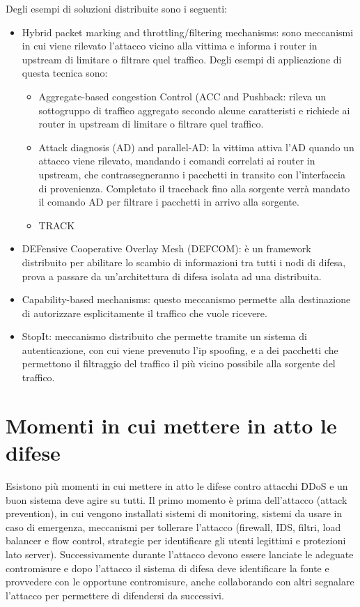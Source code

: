 Degli esempi di soluzioni distribuite sono i seguenti:
\begin{itemize}
    \item Hybrid packet marking and throttling/filtering mechanisms: sono meccanismi in cui viene rilevato l'attacco vicino alla vittima e informa i router in upstream di limitare o filtrare quel traffico. Degli esempi di applicazione di questa tecnica sono:
    \begin{itemize}
        \item Aggregate-based  congestion Control (ACC and Pushback: rileva un sottogruppo di traffico aggregato secondo alcune caratteristi e richiede ai router in upstream di limitare o filtrare quel traffico.
        \item Attack diagnosis (AD) and parallel-AD: la vittima attiva l'AD quando un attacco viene rilevato, mandando i comandi correlati ai router in upstream, che contrassegneranno i pacchetti in transito con l'interfaccia di provenienza. Completato il traceback fino alla sorgente verrà mandato il comando AD per filtrare i pacchetti in arrivo alla sorgente.
        \item TRACK
    \end{itemize}
    \item DEFensive Cooperative Overlay Mesh (DEFCOM): è un framework distribuito per abilitare lo scambio di informazioni tra tutti i nodi di difesa, prova a passare da un'architettura di difesa isolata ad una distribuita.
    \item Capability-based mechanisms: questo meccanismo permette alla destinazione di autorizzare esplicitamente il traffico che vuole ricevere.
    \item StopIt: meccanismo distribuito che permette tramite un sistema di autenticazione, con cui viene prevenuto l'ip spoofing, e a dei pacchetti che permettono il filtraggio del traffico il più vicino possibile alla sorgente del traffico.

\end{itemize}

\section{Momenti in cui mettere in atto le difese}

Esistono più momenti in cui mettere in atto le difese contro attacchi DDoS e un buon sistema deve agire su tutti.
Il primo momento è prima dell'attacco (attack prevention), in cui vengono installati sistemi di monitoring, sistemi da usare in caso di emergenza, meccanismi per tollerare l'attacco (firewall, IDS, filtri, load balancer e flow control, strategie per identificare gli utenti legittimi e protezioni lato server). Successivamente durante l'attacco devono essere lanciate le adeguate contromisure e dopo l'attacco il sistema di difesa deve identificare la fonte e provvedere con le opportune contromisure, anche collaborando con altri segnalare l'attacco per permettere di difendersi da successivi.

